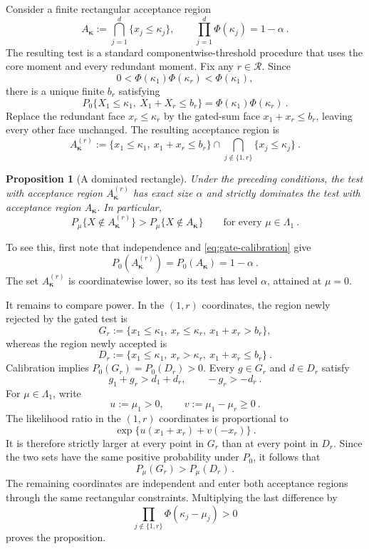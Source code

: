 \documentclass[12pt]{article}
\newtheorem{proposition}{Proposition}
\theoremstyle{remark}
\begin{document}
Consider a finite rectangular acceptance region
\begin{equation}\label{eq:general-rectangle}
A_{\bm\kappa}
:=
\bigcap_{j=1}^d\{x_j\le\kappa_j\},
\qquad
\prod_{j=1}^d\Phi(\kappa_j)=1-\alpha~.
\end{equation}
The resulting test is a standard componentwise-threshold procedure that uses
the core moment and every redundant moment.  Fix any $r\in\mathcal R$.  Since
\[
0<\Phi(\kappa_1)\Phi(\kappa_r)<\Phi(\kappa_1),
\]
there is a unique finite $b_r$ satisfying
\begin{equation}\label{eq:gate-calibration}
P_0\{X_1\le\kappa_1,\ X_1+X_r\le b_r\}
=
\Phi(\kappa_1)\Phi(\kappa_r)~.
\end{equation}
Replace the redundant face $x_r\le\kappa_r$ by the gated-sum face
$x_1+x_r\le b_r$, leaving every other face unchanged.  The resulting
acceptance region is
\begin{equation}\label{eq:gated-rectangle}
A_{\bm\kappa}^{(r)}
:=
\{x_1\le\kappa_1,\ x_1+x_r\le b_r\}
\cap
\bigcap_{j\notin\{1,r\}}\{x_j\le\kappa_j\}~.
\end{equation}

\begin{proposition}[A dominated rectangle]\label{prop:rectangle-dominated}
Under the preceding conditions, the test with acceptance region
$A_{\bm\kappa}^{(r)}$ has exact size $\alpha$ and strictly dominates the test
with acceptance region $A_{\bm\kappa}$.  In particular,
\[
P_\mu\{X\notin A_{\bm\kappa}^{(r)}\}
>
P_\mu\{X\notin A_{\bm\kappa}\}
\qquad
\text{for every }\mu\in\Lambda_1~.
\]
\end{proposition}

To see this, first note that independence and
\eqref{eq:gate-calibration} give
\[
P_0(A_{\bm\kappa}^{(r)})
=
P_0(A_{\bm\kappa})
=1-\alpha~.
\]
The set $A_{\bm\kappa}^{(r)}$ is coordinatewise lower, so its test has level
$\alpha$, attained at $\mu=0$.

It remains to compare power.  In the $(1,r)$ coordinates, the region newly
rejected by the gated test is
\[
G_r
:=
\{x_1\le\kappa_1,\ x_r\le\kappa_r,\ x_1+x_r>b_r\},
\]
whereas the region newly accepted is
\[
D_r
:=
\{x_1\le\kappa_1,\ x_r>\kappa_r,\ x_1+x_r\le b_r\}~.
\]
Calibration implies $P_0(G_r)=P_0(D_r)>0$.  Every $g\in G_r$ and $d\in D_r$
satisfy
\[
g_1+g_r>d_1+d_r,
\qquad
-g_r>-d_r~.
\]
For $\mu\in\Lambda_1$, write
\[
u:=\mu_1>0,
\qquad
v:=\mu_1-\mu_r\ge0~.
\]
The likelihood ratio in the $(1,r)$ coordinates is proportional to
\[
\exp\{u(x_1+x_r)+v(-x_r)\}~.
\]
It is therefore strictly larger at every point in $G_r$ than at every point
in $D_r$.  Since the two sets have the same positive probability under
$P_0$, it follows that
\[
P_\mu(G_r)>P_\mu(D_r)~.
\]
The remaining coordinates are independent and enter both acceptance regions
through the same rectangular constraints.  Multiplying the last difference
by
\[
\prod_{j\notin\{1,r\}}\Phi(\kappa_j-\mu_j)>0
\]
proves the proposition.
\end{document}
